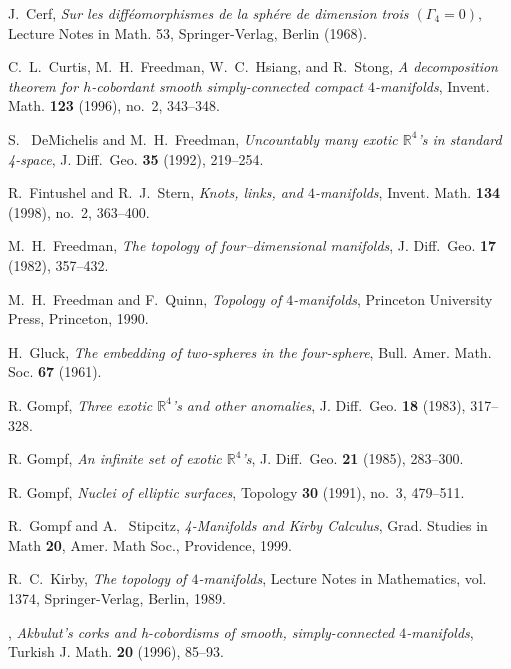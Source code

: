 \documentclass[11pt]{amsart}
\theoremstyle{definition}
\begin{document}
\begin{thebibliography}{10}
J.~Cerf, \emph{Sur les diff\'eomorphismes de la sph\'ere de dimension trois $(\Gamma_4 = 0)$}, Lecture Notes in Math. 53, Springer-Verlag, Berlin (1968).

C.~L.~Curtis, M.~H.~Freedman, W.~C.~Hsiang, and R.~Stong,
  \emph{A decomposition theorem for {$h$}-cobordant smooth simply-connected
  compact {$4$}-manifolds}, Invent. Math. \textbf{123} (1996), no.~2, 343--348.

S. ~DeMichelis and M.~H.~Freedman, \emph{Uncountably many exotic $\mathbb{R}^4$'s in standard 4-space}, J.
  Diff.\ Geo. \textbf{35} (1992), 219--254.

R.~Fintushel and R.~J.~Stern, \emph{Knots, links, and $4$-manifolds}, Invent.
Math. \textbf{134} (1998), no.~2, 363--400.

M.~H.~Freedman, \emph{The topology of four--dimensional manifolds}, J.
  Diff.\ Geo. \textbf{17} (1982), 357--432.

M.~H.~Freedman and F.~Quinn, \emph{Topology of {$4$}-manifolds}, Princeton University Press, Princeton, 1990.

H.~Gluck, \emph{The embedding of two-spheres in the four-sphere}, Bull. Amer. Math. Soc. {\bf 67} (1961). %

R. Gompf, \emph{Three exotic $\mathbb{R}^4$'s and other anomalies},  J. Diff.\ Geo. {\bf 18} (1983), 317--328. 

R. Gompf, \emph{An infinite set of exotic $\mathbb{R}^4$'s}, J. Diff.\ Geo. {\bf 21} (1985), 283--300. 

R. Gompf, \emph{Nuclei of elliptic surfaces}, Topology {\bf 30} (1991), no.~3, 479--511. %

R.~Gompf and A. ~Stipcitz, \emph{4-Manifolds and Kirby Calculus},  Grad. Studies in Math {\bf 20}, Amer. Math Soc., Providence, 1999.  

R.~C.~Kirby, \emph{The topology of {$4$}-manifolds}, Lecture Notes in Mathematics, vol. 1374, Springer-Verlag, Berlin, 1989. %

\bysame, \emph{Akbulut's corks and h-cobordisms of smooth, simply-connected $4$-manifolds}, Turkish J. Math. \textbf{20} (1996), 85--93.
  

\end{thebibliography}
\end{document}
